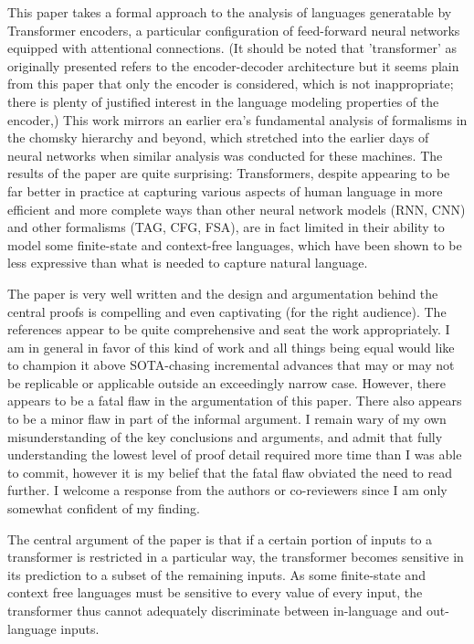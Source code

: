 \documentclass[11pt,a4paper]{article}
\begin{document}
        This paper takes a formal approach to the analysis of languages
generatable by Transformer encoders, a particular configuration of
feed-forward neural networks equipped with attentional
connections. (It should be noted that 'transformer' as originally
presented refers to the encoder-decoder architecture but it seems
plain from this paper that only the encoder is considered, which is
not inappropriate; there is plenty of justified interest in the
language modeling properties of the encoder,) This work mirrors an earlier
era's
fundamental analysis of formalisms in the chomsky hierarchy and
beyond, which stretched into the earlier days of neural networks when
similar analysis was conducted for these machines. The results of the
paper are quite surprising: Transformers, despite appearing to be far
better in practice at capturing various aspects of human language in more
efficient and more complete ways than other neural network models
(RNN, CNN) and other formalisms (TAG, CFG, FSA), are in fact limited
in their ability to model some finite-state and context-free
languages, which have been shown to be less expressive than what is
needed to capture natural language.

The paper is very well written and the design and argumentation behind
the central proofs is compelling and even captivating (for the right
audience). The references appear to be quite comprehensive and seat
the work appropriately. I am in general in favor of this kind of work
and all things being equal would like to champion it above
SOTA-chasing incremental advances that may or may not be replicable or
applicable outside an exceedingly narrow case. However, there appears
to be a fatal flaw in the argumentation of this paper. There  also
appears to be a minor flaw in part of the informal argument. I remain
wary of my own misunderstanding of the key conclusions and arguments,
and admit that fully understanding the lowest level of proof detail
required more time than I was able to commit, however it is my belief
that the fatal flaw obviated the need to read further. I welcome a
response from the authors or co-reviewers since I am only somewhat
confident of my finding.


The central argument of the paper is that if a certain portion of
inputs to a transformer is restricted in a particular way, the
transformer becomes sensitive in its prediction to a subset of the
remaining inputs. As some finite-state and context free languages must
be sensitive to every value of every input, the transformer thus
cannot adequately discriminate between in-language and out-language
inputs.
\end{document}
